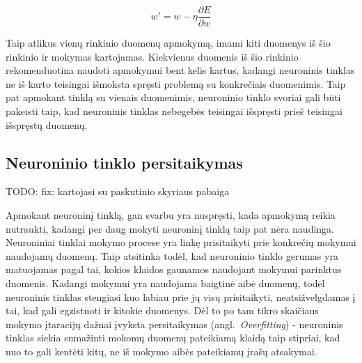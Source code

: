 \documentclass{VUMIFPSbakalaurinis}
\newcommand{\TODO}[1]{
\colorbox{todo-background-color}{TODO: #1}
}
\begin{document}
\begin{equation}\label{eq:learning}
w' = w - \eta\frac{\partial E}{\partial w}
\end{equation}

Taip atlikus vienų rinkinio duomenų apmokymą, imami kiti duomenys iš šio rinkinio ir mokymas kartojamas.
Kiekvienus duomenis iš šio rinkinio rekomenduotina naudoti apmokymui bent kelis kartus, kadangi neuroninis tinklas ne iš karto teisingai išmoksta spręsti problemą su konkrečiais duomenimis.
Taip pat apmokant tinklą su vienais duomenimis, neuroninio tinklo svoriai gali būti pakeisti taip, kad neuroninis tinklas nebegebės teisingai išspręsti prieš teisingai išspręstų duomenų.




\subsection{Neuroninio tinklo persitaikymas}

\TODO{fix: kartojasi su paskutinio skyriaus pabaiga}



Apmokant neuroninį tinklą, gan svarbu yra nuspręsti, kada apmokymą reikia nutraukti, kadangi per daug mokyti neuroninį tinklą taip pat nėra naudinga.
Neuroniniai tinklai mokymo procese yra linkę prisitaikyti prie konkrečių mokymui naudojamų duomenų.
Taip atsitinka todėl, kad neuroninio tinklo gerumas yra matuojamas pagal tai, kokios klaidos gaunamos naudojant mokymui parinktus duomenis.
Kadangi mokymui yra naudojama baigtinė aibė duomenų, todėl neuroninis tinklas stengiasi kuo labiau prie jų visų prisitaikyti, neatsižvelgdamas į tai, kad gali egzistuoti ir kitokie duomenys.
Dėl to po tam tikro skaičiaus mokymo įtaracijų dažnai įvyksta persitaikymas (angl.~\textit{Overfitting}) - neuroninis tinklas siekia sumažinti mokomų duomenų pateikiamą klaidą taip stipriai, kad nuo to gali kentėti kitų, ne iš mokymo aibės pateikiamų įrašų atsakymai.
\end{document}
